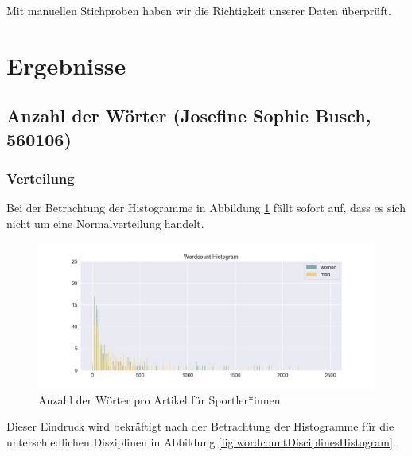 \documentclass[11pt]{article}
\begin{document}
Mit manuellen Stichproben haben wir die Richtigkeit unserer Daten überprüft.

\section{Ergebnisse}
\subsection{Anzahl der Wörter (Josefine Sophie Busch, 560106)}
\subsubsection{Verteilung}
Bei der Betrachtung der Histogramme in Abbildung \ref{fig:wordcountHistogram} fällt sofort auf, dass es sich nicht um eine Normalverteilung handelt.

\begin{figure}
\includegraphics[width=1\textwidth]{figures/wordcount_small_bins_histogram.png}
\caption[Anzahl der Wörter pro Artikel für Sportler*innen]{Anzahl der Wörter pro Artikel für Sportler*innen}
\label{fig:wordcountHistogram}
\end{figure}

Dieser Eindruck wird bekräftigt nach der Betrachtung der Histogramme für die unterschiedlichen Disziplinen in Abbildung \ref{fig:wordcountDisciplinesHistogram}.
\end{document}
